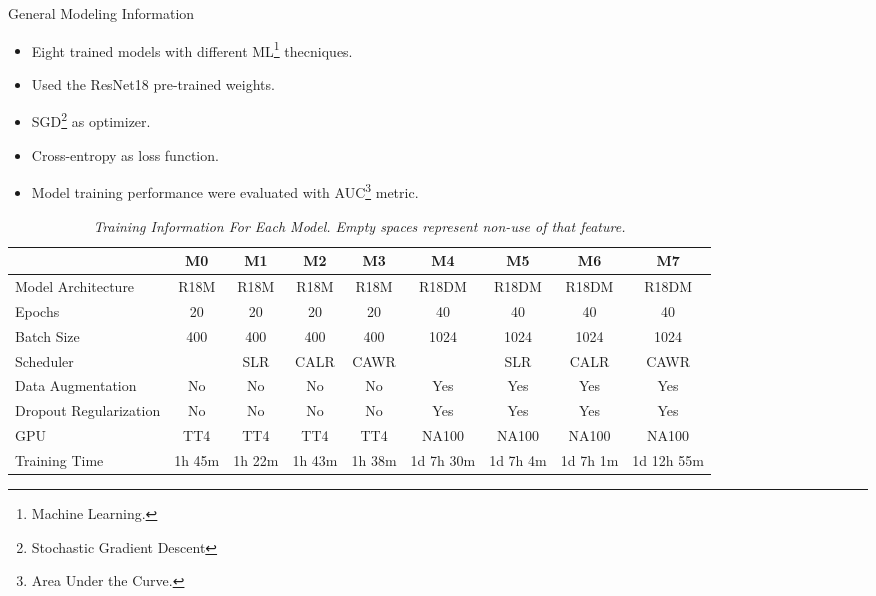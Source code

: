 \documentclass[dvipsnames,mathserif]{beamer}
\begin{document}
{\begin{frame}
      \large General Modeling Information
      \vspace{0.25cm}

      \footnotesize

      \begin{itemize}
        \item Eight trained models with different ML\footnote{Machine Learning.} thecniques.
        \item Used the ResNet18 pre-trained weights.
        \item SGD\footnote{Stochastic Gradient Descent} as optimizer.
        \item Cross-entropy as loss function.
        \item Model training performance were evaluated with AUC\footnote{Area Under the Curve.} metric.
      \end{itemize}

    \end{frame}

    \begin{frame}


      \begin{table}

        \centering
        \begin{adjustbox}{width=\textwidth}
          \begin{tabular}{lcccccccc}
            \toprule
      & \textbf{M0} & \textbf{M1} & \textbf{M2} & \textbf{M3} & \textbf{M4} & \textbf{M5} & \textbf{M6} & \textbf{M7} \\
      \midrule
            Model Architecture & R18M & R18M & R18M & R18M & R18DM & R18DM & R18DM & R18DM \\
            Epochs & 20 & 20 & 20 & 20 & 40 & 40 & 40 & 40 \\
            Batch Size & 400 & 400 & 400 & 400 & 1024 & 1024 & 1024 & 1024 \\
            Scheduler & & SLR & CALR & CAWR &  & SLR & CALR & CAWR  \\
            Data Augmentation & No & No & No & No  & Yes & Yes & Yes & Yes \\
            Dropout Regularization & No & No & No & No  & Yes & Yes & Yes & Yes \\
            GPU & TT4 & TT4 & TT4 & TT4 & NA100 & NA100 & NA100 & NA100 \\
            Training Time & 1h 45m & 1h 22m & 1h 43m & 1h 38m & 1d 7h 30m & 1d 7h 4m & 1d 7h 1m & 1d 12h 55m \\ \bottomrule
          \end{tabular}
        \end{adjustbox}
        \caption[Training Information For Each Model.]
        {\textit{\footnotesize{Training Information For Each Model. Empty spaces represent non-use of that feature.}}}
        {\label{table:trained-models-information}}
      \end{table}


\end{frame}}
\end{document}
